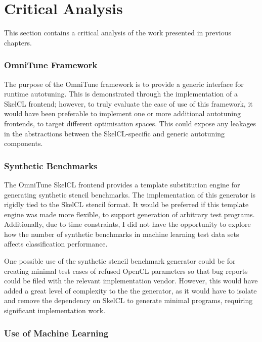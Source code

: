\section{Critical Analysis}

This section contains a critical analysis of the work presented in
previous chapters.

\subsubsection{OmniTune Framework}

The purpose of the OmniTune framework is to provide a generic
interface for runtime autotuning. This is demonstrated through the
implementation of a SkelCL frontend; however, to truly evaluate the
ease of use of this framework, it would have been preferable to
implement one or more additional autotuning frontends, to target
different optimisation spaces. This could expose any leakages in the
abstractions between the SkelCL-specific and generic autotuning
components.


\subsubsection{Synthetic Benchmarks}

The OmniTune SkelCL frontend provides a template substitution engine
for generating synthetic stencil benchmarks. The implementation of
this generator is rigidly tied to the SkelCL stencil format. It would
be preferred if this template engine was made more flexible, to
support generation of arbitrary test programs. Additionally, due to
time constraints, I did not have the opportunity to explore how the
number of synthetic benchmarks in machine learning test data sets
affects classification performance.

One possible use of the synthetic stencil benchmark generator could be
for creating minimal test cases of refused OpenCL parameters so that
bug reports could be filed with the relevant implementation
vendor. However, this would have added a great level of complexity to
the the generator, as it would have to isolate and remove the
dependency on SkelCL to generate minimal programs, requiring
significant implementation work.


\subsubsection{Use of Machine Learning}

